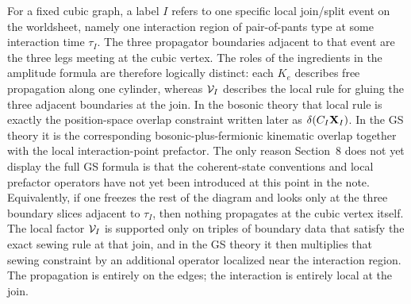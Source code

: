 \documentclass[11pt]{article}
\numberwithin{equation}{section}
\begin{document}
For a fixed cubic graph, a label $I$ refers to one specific local join/split event on the worldsheet, namely one interaction region of pair-of-pants type at some interaction time $\tau_I$. The three propagator boundaries adjacent to that event are the three legs meeting at the cubic vertex. The roles of the ingredients in the amplitude formula are therefore logically distinct: each $K_e$ describes free propagation along one cylinder, whereas ${\cal V}_I$ describes the local rule for gluing the three adjacent boundaries at the join. In the bosonic theory that local rule is exactly the position-space overlap constraint written later as $\delta(C_I{\bf X}_I)$. In the GS theory it is the corresponding bosonic-plus-fermionic kinematic overlap together with the local interaction-point prefactor. The only reason Section~8 does not yet display the full GS formula is that the coherent-state conventions and local prefactor operators have not yet been introduced at this point in the note.
Equivalently, if one freezes the rest of the diagram and looks only at the three boundary slices adjacent to $\tau_I$, then nothing propagates at the cubic vertex itself. The local factor ${\cal V}_I$ is supported only on triples of boundary data that satisfy the exact sewing rule at that join, and in the GS theory it then multiplies that sewing constraint by an additional operator localized near the interaction region. The propagation is entirely on the edges; the interaction is entirely local at the join.
\end{document}
